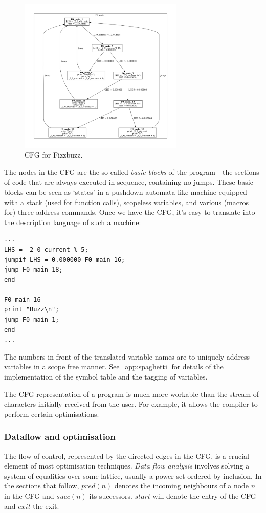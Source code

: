 \documentclass[12pt,a4paper]{article}
\begin{document}
\begin{figure}[H]
\centering
\includegraphics[width=0.7\textwidth]{images/fizzcfg}
\vspace{-1cm}
\caption{CFG for Fizzbuzz.}
\end{figure}

The nodes in the CFG are the so-called \textit{basic blocks} of the program - the sections of code that are always executed in sequence, containing no jumps.
These basic blocks can be seen as `states' in a pushdown-automata-like machine equipped with a stack (used for function calls), scopeless variables, and various (macros for) three address commands. Once we have the CFG, it's easy to translate into the description language of such a machine:

\begin{verbatim}
...
LHS = _2_0_current % 5;
jumpif LHS = 0.000000 F0_main_16;
jump F0_main_18;
end

F0_main_16
print "Buzz\n";
jump F0_main_1;
end
...
\end{verbatim}

The numbers in front of the translated variable names are to uniquely address variables in a scope free manner. See~\cref{app:spaghetti} for details of the implementation of the symbol table and the tagging of variables.

The CFG representation of a program is much more workable than the stream of characters initially received from the user. For example, it allows the compiler to perform certain optimisations.

\subsubsection{Dataflow and optimisation}
The flow of control, represented by the directed edges in the CFG, is a crucial element of most optimisation techniques. \textit{Data flow analysis} involves solving a system of equalities over some lattice, usually a power set ordered by inclusion. In the sections that follow,
$pred(n)$ denotes the incoming neighbours of a node $n$ in the CFG and $succ(n)$ its successors. $start$ will denote the entry of the CFG and $exit$ the exit.
\end{document}
